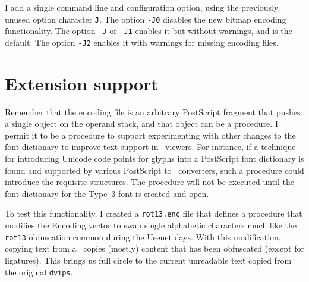 \documentclass[final]{ltugboat}
\def\PDF{\acro{PDF}}
\def\dvips{\texttt{dvips}}
\begin{document}
I add a single command line and configuration option, using the
previously unused option character \texttt{J}.  The option
\texttt{-J0} disables the new bitmap encoding functionality.
The option \texttt{-J} or \texttt{-J1} enables it but without
warnings, and is the default.  The option \texttt{-J2} enables
it with warnings for missing encoding files.

\section{Extension support}

Remember that the encoding file is an arbitrary PostScript fragment
that pushes a single object on the operand stack, and that object
can be a procedure.  I permit it to be a procedure to support
experimenting with other changes to the font dictionary to improve
text support in \PDF\ viewers.  For instance, if a technique for
introducing Unicode code points for glyphs into a PostScript font
dictionary is found and supported by various PostScript
to \PDF\ converters, such a procedure could introduce the requisite
structures.  The procedure will not be executed until the
font dictionary for the Type~3 font is created and open.

To test this functionality, I created a \texttt{rot13.enc} file
that defines a procedure that modifies the Encoding vector to swap
single alphabetic characters much like the \texttt{rot13} obfuscation
common during the Usenet days.  With this modification, copying
text from a \PDF\ copies (mostly) content that has been obfuscated
(except for ligatures).  This brings us full circle to the
current unreadable text copied from the original \dvips.




\makesignature
\end{document}
